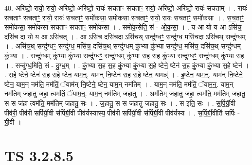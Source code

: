 \documentclass[17pt]{extarticle}
\begin{document}
40. अरि॑ष्टो॒ रायो॒ रायो॒ अरि॑ष्टो॒ अरि॑ष्टो॒ रायः॑ सचताꣳ सचताꣳ॒॒ रायो॒ अरि॑ष्टो॒ अरि॑ष्टो॒ रायः॑ सचताम् । . रायः॑ सचताꣳ सचताꣳ॒॒ रायो॒ रायः॑ सचताꣳ॒॒ समो॑कसा॒ समो॑कसा सचताꣳ॒॒ रायो॒ रायः॑ सचताꣳ॒॒ समो॑कसा । . स॒च॒ताꣳ॒॒ समो॑कसा॒ समो॑कसा सचताꣳ सचताꣳ॒॒ समो॑कसा । . समो॑क॒सेति॒ सं - ओ॒क॒सा॒ । . य आ यो य आ ऽसि॑च॒ दसि॑च॒ दा यो य आ ऽसि॑चत् । . आ ऽसि॑च॒ दसि॑च॒दा ऽसि॑च॒थ् सन्दु॑ग्धꣳ॒॒ सन्दु॑ग्ध॒ मसि॑च॒दा ऽसि॑च॒थ् सन्दु॑ग्धम् । . असि॑च॒थ् सन्दु॑ग्धꣳ॒॒ सन्दु॑ग्ध॒ मसि॑च॒ दसि॑च॒थ् सन्दु॑ग्धम् कुं॒भ्या कुं॒भ्या सन्दु॑ग्ध॒ मसि॑च॒ दसि॑च॒थ् सन्दु॑ग्धम् कुं॒भ्या । . सन्दु॑ग्धम् कुं॒भ्या कुं॒भ्या सन्दु॑ग्धꣳ॒॒ सन्दु॑ग्धम् कुं॒भ्या स॒ह स॒ह कुं॒भ्या सन्दु॑ग्धꣳ॒॒ सन्दु॑ग्धम् कुं॒भ्या स॒ह । . सन्दु॑ग्ध॒मिति॒ सं - दु॒ग्ध॒म् । . कुं॒भ्या स॒ह स॒ह कुं॒भ्या कुं॒भ्या स॒हे ष्टेने॒ ष्टेन॑ स॒ह कुं॒भ्या कुं॒भ्या स॒हे ष्टेन॑ । . स॒हे ष्टेने॒ ष्टेन॑ स॒ह स॒हे ष्टेन॒ याम॒न्॒. याम॑न् नि॒ष्टेन॑ स॒ह स॒हे ष्टेन॒ यामन्न्॑ । . इ॒ष्टेन॒ याम॒न्॒. याम॑न् नि॒ष्टेने॒ ष्टेन॒ याम॒न् नम॑ति॒ मम॑तिं॒ ॅयाम॑न् नि॒ष्टेने॒ ष्टेन॒ याम॒न् नम॑तिम् । . याम॒न् नम॑ति॒ मम॑तिं॒ ॅयाम॒न्॒. याम॒न् नम॑तिम् जहातु जहा॒ त्वम॑तिं॒ ॅयाम॒न्॒. याम॒न् नम॑तिम् जहातु । . अम॑तिम् जहातु जहा॒ त्वम॑ति॒ मम॑तिम् जहातु॒ स स ज॑हा॒ त्वम॑ति॒ मम॑तिम् जहातु॒ सः । . ज॒हा॒तु॒ स स ज॑हातु जहातु॒ सः । . स इति॒ सः । . स॒र्पि॒र्ग्री॒वी पीव॑री॒ पीव॑री सर्पिर्ग्री॒वी स॑र्पिर्ग्री॒वी पीव॑र्यस्यास्य॒ पीव॑री सर्पिर्ग्री॒वी स॑र्पिर्ग्री॒वी पीव॑र्यस्य । . स॒र्पि॒र्ग्री॒वीति॑ सर्पिः - ग्री॒वी । \newline
\pagebreak
{}

\section{ TS 3.2.8.5 }
\end{document}
